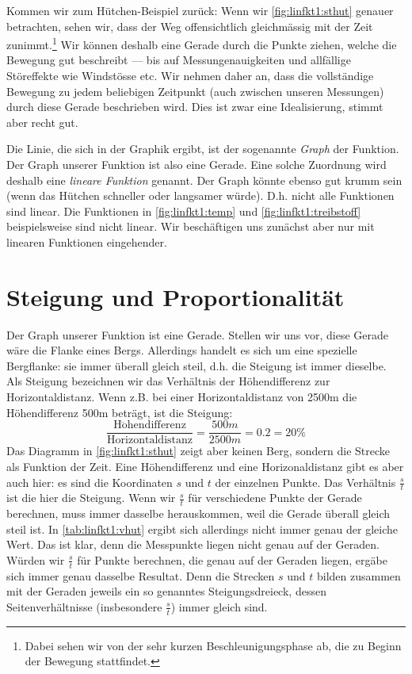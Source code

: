 \documentclass[%
11pt,%
twoside,%
titlepage,%
german,%
headsepline%
]{scrartcl}
\begin{document}
Kommen wir zum H\"utchen-Beispiel zur\"uck: Wenn wir \ref{fig:linfkt1:sthut} genauer betrachten, sehen wir, dass der Weg offensichtlich gleichm\"assig mit der Zeit zunimmt.\footnote{Dabei sehen wir von der sehr kurzen Beschleunigungsphase ab, die zu Beginn der Bewegung stattfindet.} Wir k\"onnen deshalb eine Gerade durch die Punkte ziehen, welche die Bewegung gut beschreibt --- bis auf Messungenauigkeiten und allf\"allige St\"oreffekte wie Windst\"osse etc. Wir nehmen daher an, dass die vollst\"andige Bewegung zu jedem beliebigen Zeitpunkt (auch zwischen unseren Messungen) durch diese Gerade beschrieben wird. Dies ist zwar eine Idealisierung, stimmt aber recht gut.

Die Linie, die sich in der Graphik ergibt, ist der sogenannte \emph{Graph} der
Funktion. Der Graph unserer Funktion ist also eine Gerade. Eine solche
Zuordnung wird deshalb eine \emph{lineare Funktion} genannt. Der Graph k\"onnte
ebenso gut krumm sein (wenn das H\"utchen schneller oder langsamer w\"urde). D.h. nicht alle Funktionen sind linear. Die Funktionen in \ref{fig:linfkt1:temp} und \ref{fig:linfkt1:treibstoff} beispielsweise sind nicht linear. Wir besch\"aftigen uns zun\"achst aber nur mit linearen Funktionen eingehender.


\section{Steigung und Proportionalit\"at}
\label{linfkt1:steigungprop}

Der Graph unserer Funktion ist eine Gerade. Stellen wir uns vor, diese Gerade w\"are die Flanke eines Bergs. Allerdings handelt es sich um eine spezielle Bergflanke: sie immer \"uberall gleich steil, d.h. die Steigung ist immer dieselbe. Als Steigung bezeichnen wir das Verh\"altnis der H\"ohendifferenz zur Horizontaldistanz. Wenn z.B. bei einer Horizontaldistanz von 2500\unit{m} die H\"ohendifferenz 500\unit{m} betr\"agt, ist die Steigung:
\begin{displaymath}
\frac{\mathrm{H\ddot{o}hendifferenz}}{\mathrm{Horizontaldistanz}}=\frac{500\unit{m}}{2500\unit{m}}=0.2=20\%
\end{displaymath}
Das Diagramm in \ref{fig:linfkt1:sthut} zeigt aber keinen Berg, sondern die Strecke als Funktion der Zeit. Eine H\"ohendifferenz und eine Horizonaldistanz gibt es aber auch hier: es sind die Koordinaten $s$ und $t$ der einzelnen Punkte. Das Verh\"altnis $\frac{s}{t}$ ist die hier die Steigung. Wenn wir $\frac{s}{t}$ f\"ur verschiedene Punkte der Gerade berechnen, muss immer dasselbe herauskommen, weil die Gerade \"uberall gleich steil ist. In \ref{tab:linfkt1:vhut} ergibt sich allerdings nicht immer genau der gleiche Wert. Das ist klar, denn die Messpunkte liegen nicht genau auf der Geraden. W\"urden wir $\frac{s}{t}$ f\"ur Punkte berechnen, die genau auf der Geraden liegen, erg\"abe sich immer genau dasselbe Resultat. Denn die Strecken $s$ und $t$ bilden zusammen mit der Geraden jeweils ein so genanntes Steigungsdreieck, dessen Seitenverh\"altnisse (insbesondere $\frac{s}{t}$) immer gleich sind.
\end{document}
